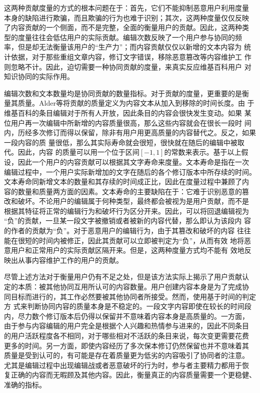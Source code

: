 这两种贡献度量的方式的根本问题在于：首先，它们不能抑制恶意用户利用度量
本身的缺陷进行欺骗，而且欺骗的行为也难于识别；其次，这两种度量仅仅反映
了内容贡献的一个侧面，而不是完整，全面的衡量用户的贡献。因此，这两种类
型的度量往往会低估用户的实际贡献。编辑次数反映了一个用户参与协同的频
率，但是却无法衡量该用户的“生产力”；而内容贡献仅仅以新增的文本内容为
统计依据，对于那些重组文章内容，修订文字错误，移除恶意篡改等内容维护工
作则忽略不计。因此，迫切需要一种协同贡献的度量，来真实反应维基百科用户
对知识协同的实际作用。

编辑次数和文本数量均是协同贡献的数量指标。对于贡献的度量，更重要的是衡
量其质量。Alder等将贡献的质量定义为内容文本从加入到移除的时间长度。由
于维基百科的条目编辑对于所有人开放，因此条目的内容会很快发生变动。如果
某位用户再一次编辑中所新增的内容质量很高，那么这些内容就会在很长一段时
间内，历经多次修订而得以保留，除非有用户用更高质量的内容替代之。反之，如果一段内容的质
量很低，那么其实际寿命就会很短，很快就在随后的编辑中被取代。因此，内容
的质量可以用一个位于区间$[-1,1]$的常数来表示。基于以上假
设，因此一个用户的内容贡献可以根据其文字寿命来度量。文本寿命是指在一次
编辑过程中，一个用户实际新增加的文字在随后的各个修订版本中所存续的时间。
文本寿命同新增文本的数量和其存续的时间成正比，因此在度量过程中兼顾了内
容的数量和质量两方面的因素。文本寿命的主要缺陷在于：它难于识别恶意的篡
改和破坏。不论用户的编辑属于何种类型，最终都会被视为是用户贡献，而不是
根据其特征将正常的编辑行为和破坏行为区分开来。因此，可以将回退编辑视为
“负”的贡献，一旦某一段文字被撤销或者被新的内容代替，那么即认为该段内
容的作者的贡献为“负”。对于恶意用户的编辑行为，由于其篡改和破坏的内容
往往能在很短的时间内被修正，因此其贡献可以立即被判定为“负”，从而有效
地将恶意用户和正常用户的实际贡献区隔开来。但是，这两种度量方式均不能有
效地反映出从事内容维护工作的用户的贡献。

尽管上述方法对于衡量用户仍有不足之处，但是该方法实际上揭示了用户贡献认
定的本质：被其他协同互用所认可的内容数量。用户创建内容本身是为了完成协
同目标而进行的，其工作必然要被其他协同者所接受。然而，使用基于时间的判定方
式来判断协同内容的质量本身是不稳定的。一段文字内容即使在较长的时间段
内，尽力数个修订版本后仍得以保留并不意味着内容本身是高质量的。一方面，
由于参与内容编辑的用户完全是根据个人兴趣和热情参与进来的，因此不同条目
的用户活跃程度各不相同，对于哪些相对不活跃的条目来说，每次变更需要花费
更多的时间。另一方面，即使内容经历了多次保本修订仍然保留也并不意味着其
质量是受到认可的，有可能是存在着质量更为低劣的内容吸引了协同者的注意。
尤其是编辑过程中出现编辑战或者恶意破坏的行为时，参与者主要精力都用于恢
复正确的内容而无暇顾及其他内容。因此，衡量真正的内容质量需要一个更稳健、
准确的指标。

